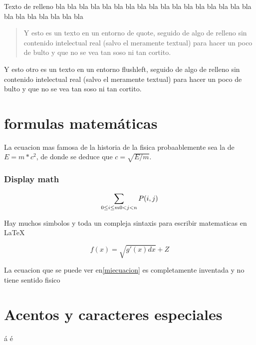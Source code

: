 \documentclass[a4paper,11pt]{article}
\begin{document}
Texto de relleno bla bla bla bla bla bla bla bla bla bla bla bla bla bla bla bla bla bla bla bla bla bla bla bla

\begin{quote}%

Y esto es un texto en un entorno de quote, seguido de algo de relleno sin contenido intelectual real (salvo el meramente textual)
 para hacer un poco de bulto y que no se vea tan soso ni tan cortito.

\end{quote}

\begin{flushright}%

Y esto otro es un texto en un entorno flushleft, seguido de algo de relleno sin contenido intelectual real (salvo el meramente textual)
 para hacer un poco de bulto y que no se vea tan soso ni tan cortito.

\end{flushright}
\part{formulas matemáticas}
La ecuacion mas famosa de la historia de la fisica probaablemente sea la de $E=m*c^2$, de donde se deduce que $c=\sqrt{E/m}$.
\section{Display math}

\begin{displaymath}
\sum_{0\le i\le m\\0<j<n}P(i, j)%
\end{displaymath}

Hay muchos simbolos y toda un compleja sintaxis para escribir matematicas en LaTeX

\begin{equation}%
\label{miecuacion}%
f(x)=\sqrt{g'(x)dx}+Z
\end{equation}

La ecuacion que se puede ver en\ref{miecuacion} es completamente inventada y no tiene sentido fisico%

\part{Acentos y caracteres especiales}
\'a \'e
\end{document}
